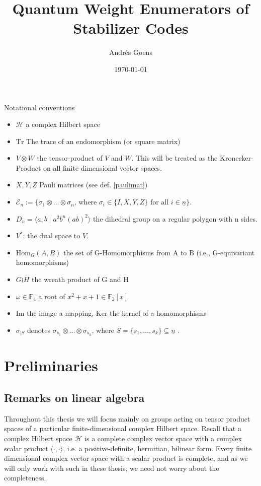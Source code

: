 \documentclass{article}
\title{Quantum Weight Enumerators of Stabilizer Codes}
\author{Andr\'{e}s Goens}
\date{\today}
\def\F{\mathbb{F}}
\def\n{\underline{n}}
\def\Hom{\text{Hom}}
\def\fa{\text{ for all }}
\def\Tr{\text{Tr}}
\theoremstyle{definition}
\begin{document}
Notational conventions

\begin{itemize}
\item $\mathcal{H}$ a complex Hilbert space
\item $\Tr$ The trace of an endomorphism (or square matrix)
\item $V \otimes W$ the tensor-product of $V$ and $W$. This will be treated as the Kronecker-Product on all finite dimensional vector spaces.
\item $X, Y, Z$ Pauli matrices (see def. \ref{paulimat})
\item $\mathcal{E}_n:= \{ \sigma_1 \otimes \ldots \otimes \sigma_n \text{, where }\sigma_i \in \{ I,X,Y,Z \} \fa i \in \n \}$.
\item $D_n = \langle a, b \mid a^2 b^n (ab)^2 \rangle$ the dihedral group on a regular polygon with n sides.
\item $V^*$: the dual space to $V$.

\item $\Hom_{G}(A,B)$ the set of G-Homomorphisms from A to B (i.e., G-equivariant homomorphisms)
\item $ G \wr H$ the wreath product of G and H
\item $ \omega \in \F_4$ a root of $x^2 + x + 1 \in \F_2[x]$
\item Im the image a mapping, Ker the kernel of a homomorphisms
\item $\sigma_{\big| S}$ denotes $\sigma_{s_1} \otimes \ldots \otimes \sigma_{s_k}$, where $S = \{ s_1, \ldots, s_k \} \subseteq \n$ .
\end{itemize}

\clearpage \newpage
\tableofcontents
\clearpage \newpage

\section{Preliminaries}

\subsection{ Remarks on linear algebra}
Throughout this thesis we will focus mainly on groups acting on tensor product spaces of a particular finite-dimensional complex Hilbert space. Recall that a complex Hilbert space $\mathcal{H}$ is a complete complex vector space with a complex scalar product $\langle \cdot , \cdot \rangle$, i.e. a positive-definite, hermitian, bilinear form. Every finite dimensional complex vector space with a scalar product is complete, and as we will only work with such in these thesis, we need not worry about the completeness.
\end{document}
